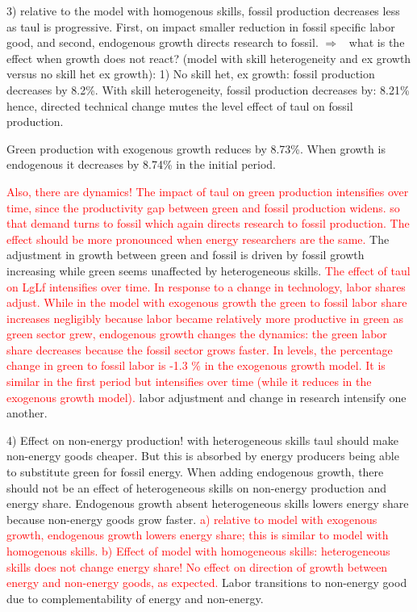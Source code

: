 \documentclass[12pt]{article}
\newcommand{\ar}{$\Rightarrow$ \ }
\newcommand{\tr}[1]{\textcolor{red}{#1}}
\begin{document}
3) relative to the model with homogenous skills, fossil production decreases less as taul is progressive. First, on impact smaller reduction in fossil specific labor good, and second, endogenous growth directs research to fossil. \ar what is the effect when growth does not react? (model with skill heterogeneity and ex growth versus no skill het ex growth): 1) No skill het, ex growth: fossil production decreases by 8.2\%. With skill heterogeneity, fossil production decreases by: 8.21\% hence, directed technical change mutes the level effect of taul on fossil production. 

Green production with exogenous growth reduces by 8.73\%. When growth is endogenous it decreases by  8.74\% in the initial period. 

\tr{Also, there are dynamics! The impact of taul on green production intensifies over time, since the productivity gap between green and fossil production widens. so that demand turns to fossil which again directs research to fossil production. The effect should be more pronounced when energy researchers are the same. } 
 The adjustment in growth between green and fossil is driven by fossil growth increasing while green seems unaffected by heterogeneous skills. 
\tr{ The effect of taul on LgLf intensifies over time. In response to a change in technology, labor shares adjust. While in the model with exogenous growth the green to fossil labor share increases negligibly because labor became relatively more productive in green as green sector grew, endogenous growth changes the dynamics: the green labor share decreases because the fossil sector grows faster. In levels, the percentage change in green to fossil labor is -1.3 \% in the exogenous growth model. It is similar in the first period but intensifies over time (while it reduces in the exogenous growth model).}
 labor adjustment and change in research intensify one another. 
 
4) Effect on non-energy production! with heterogeneous skills taul should make non-energy goods cheaper. But this is absorbed by energy producers being able to substitute green for fossil energy. When adding endogenous growth, there should not be an effect of heterogeneous skills on non-energy production and energy share. Endogenous growth absent heterogeneous skills lowers energy share because non-energy goods grow faster. 
\tr{a) relative to model with exogenous growth, endogenous growth lowers energy share; this is similar to model with homogenous skills. b) Effect of model with homogeneous skills: heterogeneous skills does not change energy share! No effect on direction of growth between energy and non-energy goods, as expected.}
Labor transitions to non-energy good due to complementability of energy and non-energy. 
\end{document}
